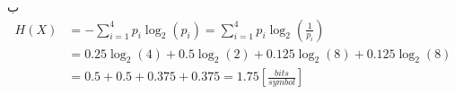 \SubProblem
{ب}
{
\begin{equation*}
\begin{aligned}
    H(X)    & = -\sum_{i=1}^{4}p_i\log_2(p_i)
            = \sum_{i=1}^{4}p_i\log_2(\frac{1}{p_i})\\
            & = 0.25\log_2(4)+0.5\log_2(2)+0.125\log_2(8)+0.125\log_2(8)\\
            & = 0.5+0.5+0.375+0.375=1.75 [\frac{bits}{symbol}]
\end{aligned}
\end{equation*}
}
